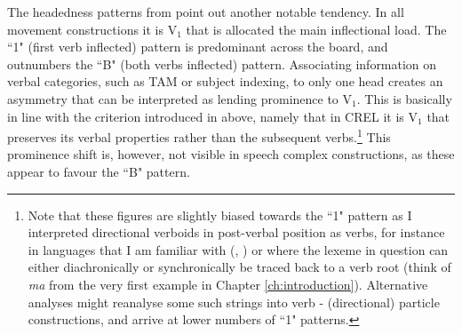 The headedness patterns from  point out another notable tendency. In all movement constructions it is V$_1$ that is allocated the main inflectional load. The ``1" (first verb inflected) pattern is predominant across the board, and outnumbers the ``B" (both verbs inflected) pattern. Associating information on verbal categories, such as TAM or subject indexing, to only one head creates an asymmetry that can be interpreted as lending prominence to V$_1$. This is basically in line with the criterion introduced in  above, namely that in CREL it is V$_1$ that preserves its verbal properties rather than the subsequent verbs.\footnote{Note that these figures are slightly biased towards the ``1" pattern as I interpreted directional verboids in post-verbal position as verbs, for instance in languages that I am familiar with (, ) or where the lexeme in question can either diachronically or synchronically be traced back to a verb root (think of  \textit{ma} from the very first example in Chapter \ref{ch:introduction}). Alternative analyses might reanalyse some such strings into verb - (directional) particle constructions, and arrive at lower numbers of ``1" patterns.} This prominence shift is, however, not visible in speech complex constructions, as these appear to favour the ``B" pattern.

